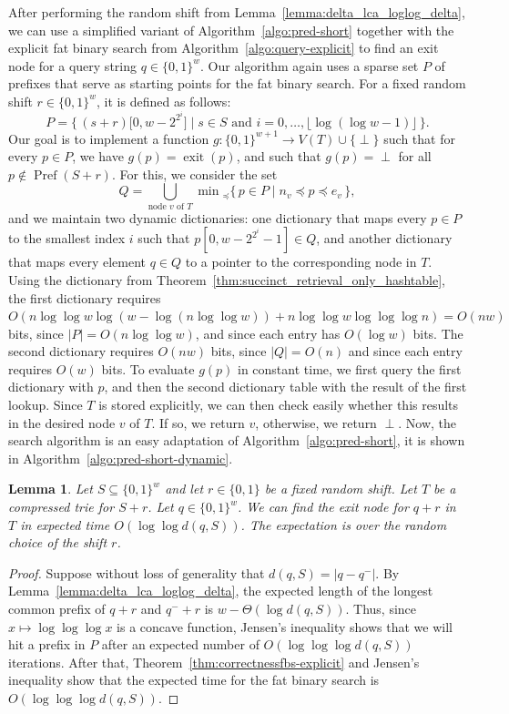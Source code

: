 \documentclass[a4paper,11pt]{article}
\newtheorem{lemma}[theorem]{Lemma}
\newcommand{\?}{\mskip1.5mu}
\DeclareMathOperator{\exit}{exit}
\DeclareMathOperator{\Pref}{Pref}
\begin{document}
After performing the random shift from 
Lemma~\ref{lemma:delta_lca_loglog_delta}, we can use a simplified 
variant of Algorithm~\ref{algo:pred-short} together with
the explicit fat binary search from Algorithm~\ref{algo:query-explicit}
to find an exit node for a query string $q \in \{0, 1\}^w$.
Our algorithm again uses a sparse set $P$ of prefixes that
serve as starting points for the fat binary search. For a
fixed random shift $r \in \{0, 1\}^w$, it is defined as 
follows:
\[
  P = \bigl\{\, (s + r)\bigl[0,w - 2^{2^i}\bigr] \mid s \in  S \text{ and }
	i = 0,\dots,\lfloor\log(\log w - 1)\rfloor\,\bigr\}.
\]
Our goal is to implement a function 
$g : \{0, 1\}^{w + 1} \rightarrow V(T) \cup \{\perp\}$ such that
for every $p \in P$, we have $g(p) = \exit(p)$, and such 
that $g(p) = \perp$ for all $p \not\in \Pref(S + r)$.
For this, we consider the set 
\[
Q=\bigcup_{\text{node $v$ of $T$}}
\min{}_\preceq\{\,p\in P\mid n_v \preceq p\preceq e_v\,\},
\]
and we maintain two dynamic dictionaries:
one dictionary that maps every $p \in P$ to the smallest
index $i$ such that $p[0, w - 2^{2^i} - 1] \in Q$, and
another dictionary that maps every element $q \in Q$ to
a pointer to the corresponding node in $T$.
Using the dictionary from 
Theorem~\ref{thm:succinct_retrieval_only_hashtable},
the  first dictionary requires 
$O(n \log \log w \log (w - \log (n \log \log w)) 
+  n \log\log w \log\log\log n) = O(nw)$ 
bits, since $|P| = O(n \log\log w)$,
and since each entry has $O(\log w)$ bits.
The second dictionary requires $O(nw)$ bits, since $|Q| = O(n)$ and
since each entry requires $O(w)$ bits.
To evaluate $g(p)$ in constant time, we first query the first dictionary with
$p$, and then the second dictionary table with the
result of the first lookup. Since $T$ is stored
explicitly, we can then check easily whether this results
in the desired node $v$ of $T$. If so, we return $v$, otherwise,
we return $\perp$. Now, the search algorithm is an easy
adaptation of Algorithm~\ref{algo:pred-short}, it is shown
in Algorithm~\ref{algo:pred-short-dynamic}.

\begin{lemma}
\label{lem:delta_fast_expected_lca}
Let $S \subseteq \{0, 1\}^w$ and let $r \in \{0, 1\}$
be a fixed random shift. Let $T$ be 
a compressed trie for $S + r$. 
Let $q \in \{0, 1\}^w$. 
We can find the exit node for $q + r$ in $T$  
in expected time $O(\log\log d(q, S))$.
The expectation is
over the random choice of the shift $r$. 
\end{lemma}

\begin{proof}
Suppose without loss of generality that 
$d(q, S) = |q - q^-|$.
By Lemma~\ref{lemma:delta_lca_loglog_delta},
the expected length of the longest common
prefix of $q + r$ and $q^- + r$ is 
$w - \Theta(\log d(q, S))$.
Thus, since $x \mapsto \log\log\log x$ is a concave function, 
Jensen's inequality shows that we will
hit a prefix in $P$ after an expected number of  $O(\log \log \log d(q, S))$
iterations. After that, 
Theorem~\ref{thm:correctnessfbs-explicit} and
Jensen's inequality show that
the expected time for the fat binary search is 
$O(\log \log \log d(q, S))$.
\end{proof}
\end{document}
